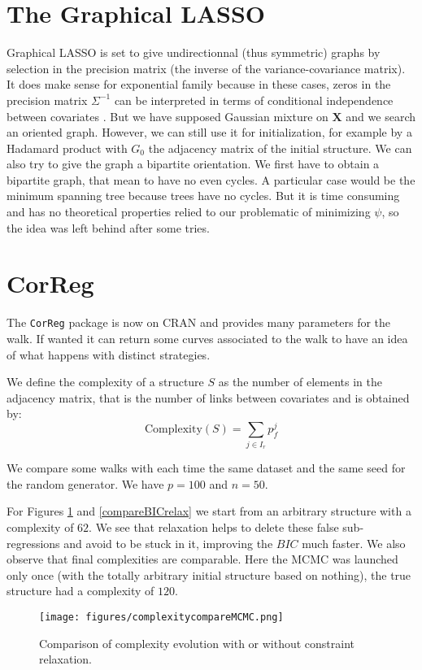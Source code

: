 \documentclass[12pt,a4paper]{report}
\begin{document}
	\section{The Graphical LASSO}\label{sectionGlasso}
		Graphical LASSO \cite{friedman2008sparse} \cite{witten2011new} \cite{tibshiranilasso} \cite{friedman2010applications} is set to give undirectionnal (thus symmetric) graphs by selection in the precision matrix (the inverse of the variance-covariance matrix). It does make sense for exponential family because in these cases, zeros in the precision matrix $\Sigma^{-1}$ can be interpreted in terms of conditional independence between covariates \cite{dempster1972covariance}. But we have supposed Gaussian mixture on $\boldsymbol{X}$ and we search an oriented graph.
	However, we can still use it for initialization, for example by a Hadamard product with $G_0$ the adjacency matrix of the initial structure. We can also try to give the graph a bipartite orientation. We first have to obtain a bipartite graph, that mean to have no even cycles. A particular case would be the minimum spanning tree \cite{graham1985history,moret1991empirical,gower1969minimum} because trees have no cycles. But it is time consuming and has no theoretical properties relied to our problematic of minimizing $\psi$, so the idea was left behind after some tries.		
	
\section{CorReg}	
	The {\tt CorReg} package is now on CRAN and provides many parameters for the walk. If wanted it can return some curves associated to the walk to have an idea of what happens with distinct strategies. 		
	
We define the complexity of a structure $S$ as the number of elements in the adjacency matrix, that is the number of links between covariates and is obtained by:
\begin{equation}
	\textrm{Complexity}(S)=\sum_{j \in I_r}p_f^j
\end{equation}	
	
		We compare some walks with each time the same dataset and the same seed for the random generator. We have $p=100$ and $n=50$.
		
		For Figures \ref{comparecomplrelax} and \ref{compareBICrelax} we start from an arbitrary structure with a complexity of $62$. We see that relaxation helps to delete these false sub-regressions and avoid to be stuck in it, improving the $BIC$ much faster. We also observe that final complexities are comparable. Here the MCMC was launched only once (with the totally arbitrary initial structure based on nothing), the true structure had a complexity of $120$.
\begin{center}
	\begin{figure}[h!]
	\centering
\texttt{[image: figures/complexitycompareMCMC.png]} 		
\caption{Comparison of complexity evolution with or without constraint relaxation.}\label{comparecomplrelax}
	\end{figure}
	\end{center}
			
\end{document}
